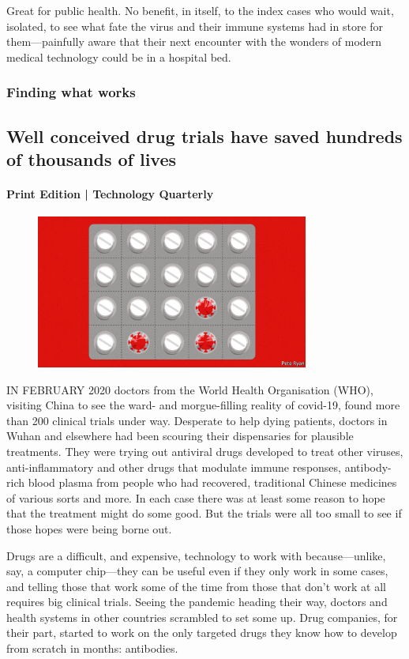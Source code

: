 \documentclass{article}
\begin{document}
Great for public health. No benefit, in itself, to the index cases who would wait, isolated, to see what fate the virus and their immune systems had in store for them---painfully aware that their next encounter with the wonders of modern medical technology could be in a hospital bed. {} 
\clearpage
\subsubsection{Finding what works }
\subsection{Well conceived drug trials have saved hundreds of thousands of lives }
\paragraph{Print Edition | Technology Quarterly  \quad \color{gray}{Mar 23rd 2021 }}
\begin{figure}[h]
\centering
\includegraphics[width=0.8\textwidth]{images/20210327_tqd003.jpg}
\end{figure}
\lettrine{I}N FEBRUARY 2020 doctors from the World Health Organisation (WHO), visiting China to see the ward- and morgue-filling reality of covid-19, found more than 200 clinical trials under way. Desperate to help dying patients, doctors in Wuhan and elsewhere had been scouring their dispensaries for plausible treatments. They were trying out antiviral drugs developed to treat other viruses, anti-inflammatory and other drugs that modulate immune responses, antibody-rich blood plasma from people who had recovered, traditional Chinese medicines of various sorts and more. In each case there was at least some reason to hope that the treatment might do some good. But the trials were all too small to see if those hopes were being borne out. 

Drugs are a difficult, and expensive, technology to work with because---unlike, say, a computer chip---they can be useful even if they only work in some cases, and telling those that work some of the time from those that don't work at all requires big clinical trials. Seeing the pandemic heading their way, doctors and health systems in other countries scrambled to set some up. Drug companies, for their part, started to work on the only targeted drugs they know how to develop from scratch in months: antibodies. 
\end{document}
